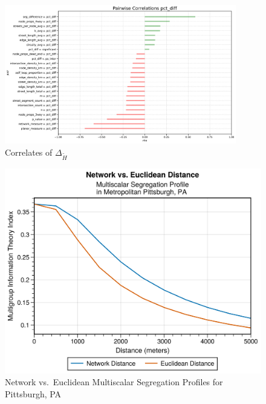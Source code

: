 \documentclass[
  10pt,
]{article}
\begin{document}
\begin{figure}
\hypertarget{fig:correlations}{%
\centering
\includegraphics[width=0.9\textwidth,height=\textheight]{./correlations.png}
\caption{Correlates of \(\Delta_{\tilde{H}}\)}\label{fig:correlations}
}
\end{figure}

\begin{figure}
\hypertarget{fig:multiscalar}{%
\centering
\includegraphics{./pitt_example.png}
\caption{Network vs.~Euclidean Multiscalar Segregation Profiles for
Pittsburgh, PA}\label{fig:multiscalar}
}
\end{figure}
\end{document}
